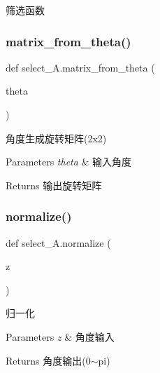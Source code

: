 筛选函数 

\mbox{\label{namespaceselect___a_af82b8a439f8a0fc85af273ad5cb344f0}} 
\subsubsection{\texorpdfstring{matrix\+\_\+from\+\_\+theta()}{matrix\_from\_theta()}}
{\footnotesize\ttfamily def select\+\_\+\+A.\+matrix\+\_\+from\+\_\+theta (\begin{DoxyParamCaption}\item[{}]{theta }\end{DoxyParamCaption})}



角度生成旋转矩阵(2x2) 


\begin{DoxyParams}{Parameters}
{\em theta} & 输入角度\\
\hline
\end{DoxyParams}
\begin{DoxyReturn}{Returns}
输出旋转矩阵 
\end{DoxyReturn}
\mbox{\label{namespaceselect___a_af57dc18a5c3e1fa5b6c139c3b34f87e6}} 
\subsubsection{\texorpdfstring{normalize()}{normalize()}}
{\footnotesize\ttfamily def select\+\_\+\+A.\+normalize (\begin{DoxyParamCaption}\item[{}]{z }\end{DoxyParamCaption})}



归一化 


\begin{DoxyParams}{Parameters}
{\em z} & 角度输入\\
\hline
\end{DoxyParams}
\begin{DoxyReturn}{Returns}
角度输出(0$\sim$pi) 
\end{DoxyReturn}
\mbox{\label{namespaceselect___a_a779a9d7134fa12ee8f82a95ec7ea63ef}} 
